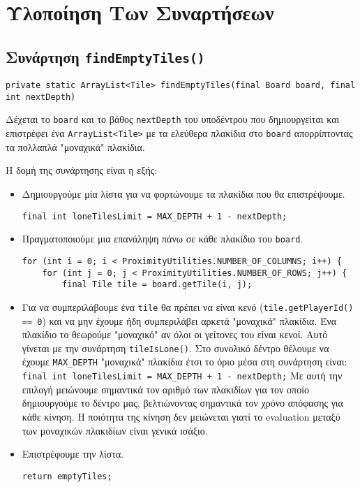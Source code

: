 \chapter{Υλοποίηση Των Συναρτήσεων}
\section{Συνάρτηση \texttt{findEmptyTiles()}}\label{fun:findEmptyTiles}
\begin{lstlisting}[title={Declaration της συνάρτησης}]
private static ArrayList<Tile> findEmptyTiles(final Board board, final int nextDepth)
\end{lstlisting}
Δέχεται το \lstinline!board! και το βάθος \lstinline!nextDepth! του υποδέντρου που δημιουργείται και επιστρέφει ένα
\lstinline!ArrayList<Tile>! με τα ελεύθερα πλακίδια στο \lstinline!board! απορρίπτοντας τα πολλαπλά "μοναχικά" πλακίδια.

Η δομή της συνάρτησης είναι η εξής:
\begin{itemize}
\item Δημιουργούμε μία λίστα για να φορτώνουμε τα πλακίδια που θα επιστρέψουμε.
\begin{lstlisting}[style=chunk]
final int loneTilesLimit = MAX_DEPTH + 1 - nextDepth;
\end{lstlisting}

\item Πραγματοποιούμε μια επανάληψη πάνω σε κάθε πλακίδιο του \lstinline!board!.
\begin{lstlisting}[style=chunk]
for (int i = 0; i < ProximityUtilities.NUMBER_OF_COLUMNS; i++) {
    for (int j = 0; j < ProximityUtilities.NUMBER_OF_ROWS; j++) {
        final Tile tile = board.getTile(i, j);
\end{lstlisting}

\item Για να συμπεριλάβουμε ένα \lstinline!tile! θα πρέπει να είναι κενό
(\lstinline!tile.getPlayerId() == 0!)
και να μην έχουμε ήδη συμπεριλάβει αρκετά "μοναχικά" πλακίδια.
Ένα πλακίδιο το θεωρούμε "μοναχικό" αν όλοι οι γείτονες του είναι κενοί.
Αυτό γίνεται με την συνάρτηση \lstinline!tileIsLone()!.
Στο συνολικό δέντρο θέλουμε να έχουμε \lstinline!MAX_DEPTH! "μοναχικά" πλακίδια έτσι το όριο μέσα στη συνάρτηση είναι:
\lstinline!final int loneTilesLimit = MAX_DEPTH + 1 - nextDepth;!
Με αυτή την επιλογή μειώνουμε σημαντικά τον αριθμό των πλακιδίων για τον οποίο δημιουργούμε το δέντρο μας,
βελτιώνοντας σημαντικά τον χρόνο απόφασης για κάθε κίνηση.
Η ποιότητα της κίνηση δεν μειώνεται γιατί το evaluation μεταξύ των μοναχικών πλακιδίων είναι γενικά ισάξιο.

\item Επιστρέφουμε την λίστα.
\begin{lstlisting}[style=chunk]
return emptyTiles;
\end{lstlisting}
\end{itemize}

